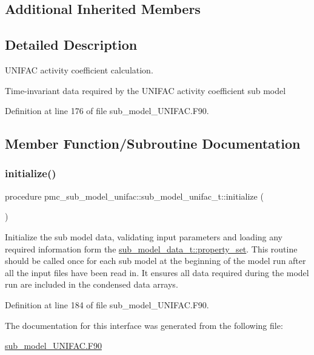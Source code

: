 \subsection*{Additional Inherited Members}


\subsection{Detailed Description}
U\+N\+I\+F\+AC activity coefficient calculation. 

Time-\/invariant data required by the U\+N\+I\+F\+AC activity coefficient sub model 

Definition at line 176 of file sub\+\_\+model\+\_\+\+U\+N\+I\+F\+A\+C.\+F90.



\subsection{Member Function/\+Subroutine Documentation}
\mbox{\label{structpmc__sub__model__unifac_1_1sub__model__unifac__t_a83e935943631e93b122ff15fd4b8dcd8}} 
\subsubsection{\texorpdfstring{initialize()}{initialize()}}
{\footnotesize\ttfamily procedure pmc\+\_\+sub\+\_\+model\+\_\+unifac\+::sub\+\_\+model\+\_\+unifac\+\_\+t\+::initialize (\begin{DoxyParamCaption}{ }\end{DoxyParamCaption})\hspace{0.3cm}{\ttfamily [private]}}



Initialize the sub model data, validating input parameters and loading any required information form the {\ttfamily \mbox{\hyperlink{structpmc__sub__model__data_1_1sub__model__data__t_aeb00155797966fc95e75ad14d45e7242}{sub\+\_\+model\+\_\+data\+\_\+t\+::property\+\_\+set}}}. This routine should be called once for each sub model at the beginning of the model run after all the input files have been read in. It ensures all data required during the model run are included in the condensed data arrays. 



Definition at line 184 of file sub\+\_\+model\+\_\+\+U\+N\+I\+F\+A\+C.\+F90.



The documentation for this interface was generated from the following file\+:\begin{DoxyCompactItemize}
\item 
\mbox{\hyperlink{sub__model___u_n_i_f_a_c_8_f90}{sub\+\_\+model\+\_\+\+U\+N\+I\+F\+A\+C.\+F90}}\end{DoxyCompactItemize}
